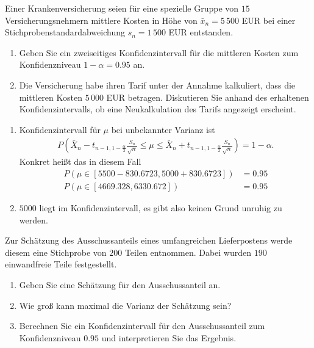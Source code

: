  Einer Krankenversicherung
seien für eine spezielle Gruppe von $15$ Versicherungsnehmern mittlere Kosten
in Höhe von $\bar x_n = 5\,500$ EUR bei einer Stichprobenstandardabweichung
$s_n = 1\, 500$ EUR entstanden.
\begin{enumerate}
    \item Geben Sie ein zweiseitiges Konfidenzintervall für die mittleren
        Kosten zum Konfidenzniveau $1-\alpha=0.95$ an. 
    \item Die Versicherung habe ihren Tarif unter der Annahme kalkuliert, dass
        die mittleren Kosten $5\, 000$ EUR betragen. Diskutieren Sie anhand des
        erhaltenen Konfidenzintervalls, ob eine Neukalkulation des Tarifs
        angezeigt erscheint. 
\end{enumerate}

\solution
\begin{enumerate}
    \item Konfidenzintervall für $\mu$ bei unbekannter Varianz ist 
        \begin{align*}
            P\left( \bar X_n - t_{n-1, 1-\frac{\alpha}{2}} \frac{S_{n}}{\sqrt{n}} 
            \leq \mu \leq \bar X_{n} + t_{n-1, 1-\frac{\alpha}{2}} \frac{S_{n}}{\sqrt{n}}
            \right) = 1-\alpha. 
        \end{align*}
        Konkret heißt das in diesem Fall
        \begin{align*}
            P\left( \mu \in\left[ 5500-830.6723,5000+830.6723 \right]\right) &= 0.95 \\
            P\left( \mu \in\left[ 4669.328, 6330.672 \right]\right) &= 0.95
        \end{align*}

    \item $5000$ liegt im Konfidenzintervall, es gibt also keinen Grund unruhig
        zu werden.
\end{enumerate}

 Zur Schätzung des Ausschussanteils eines
umfangreichen Lieferpostens werde diesem eine Stichprobe von $200$ Teilen entnommen. 
Dabei wurden $190$ einwandfreie Teile festgestellt.
\begin{enumerate}
    \item Geben Sie eine Schätzung für den Ausschussanteil an.
    \item Wie groß kann maximal die Varianz der Schätzung sein? 

    \item Berechnen Sie ein Konfidenzintervall für den Ausschussanteil zum
        Konfidenzniveau $0.95$ und interpretieren Sie das Ergebnis.
\end{enumerate}

